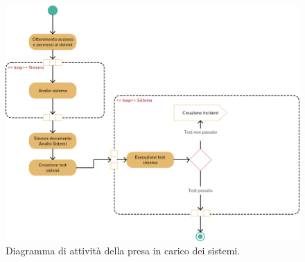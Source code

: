                 \begin{figure}[H]
					\centering
					\includegraphics[width=\textwidth]{immagini/rollout/carico-sistemi}
					\caption{Diagramma di attività della presa in carico dei sistemi.}
				\end{figure}
                
